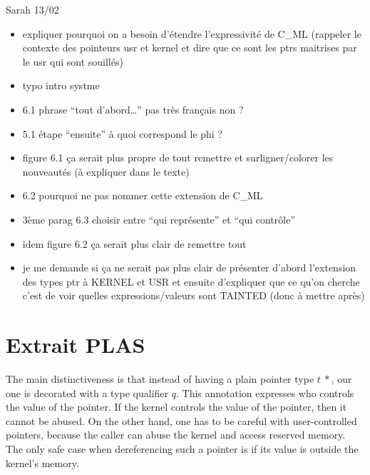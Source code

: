 Sarah 13/02

\begin{itemize}
\item
  expliquer pourquoi on a besoin d'étendre l'expressivité de C\_ML
  (rappeler le contexte des pointeurs usr et kernel et dire que ce sont
  les ptrs maitrises par le usr qui sont souillés)
\item
  typo intro systme
\item
  6.1 phrase ``tout d'abord\ldots{}'' pas très français non ?
\item
  5.1 étape ``ensuite'' à quoi correspond le phi ?
\item
  figure 6.1 ça serait plus propre de tout remettre et surligner/colorer
  les nouveautés (à expliquer dans le texte)
\item
  6.2 pourquoi ne pas nommer cette extension de C\_ML
\item
  3ème parag 6.3 choisir entre ``qui représente'' et ``qui contrôle''
\item
  idem figure 6.2 ça serait plus clair de remettre tout
\item
  je me demande si ça ne serait pas plus clair de présenter d'abord
  l'extension des types ptr à KERNEL et USR et ensuite d'expliquer que
  ce qu'on cherche c'est de voir quelles expressions/valeurs sont
  TAINTED (donc à mettre après)
\end{itemize}






\section*{Extrait PLAS}

The main distinctiveness is that instead of having a plain pointer type
$t~*$, our one is decorated with a type qualifier $q$. This annotation expresses
who controls the value of the pointer. If the kernel controls the value of the
pointer, then it cannot be abused. On the other hand, one has to be careful
with user-controlled pointers, because the caller can abuse the kernel and
access reserved memory. The only safe case when dereferencing such a pointer is
if its value is outside the kernel's memory.

